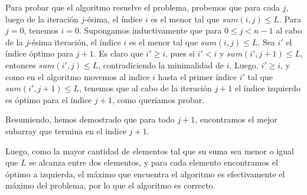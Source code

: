 Para probar que el algoritmo resuelve el problema, probemos que para cada $j$, luego de la iteraci\'on $j$-\'esima, el \'indice $i$ es el menor tal que $sum(i, j) \leq L$. Para $j=0$, tenemos $i=0$. Supongamos inductivamente que para $0\leq j < n-1$ al cabo de la $j$-\'esima iteraci\'on, el \'indice $i$ es el menor tal que $sum(i, j) \leq L$. Sea $i'$ el \'indice \'optimo para $j+1$. Es claro que $i' \geq i$, pues si $i' < i$ y $sum(i', j+1) \leq L$, entonces $sum(i', j) \leq L$, contradiciendo la minimalidad de $i$. Luego, $i' \geq i$, y como en el algoritmo movemos al indice $i$ hasta el primer \'indice $i'$ tal que $sum(i', j+1) \leq L$, tenemos que al cabo de la iteraci\'on $j+1$ el \'indice izquierdo es \'optimo para el \'indice $j+1$, como quer\'iamos probar.

Resumiendo, hemos demostrado que para todo $j+1$, encontramos el mejor subarray que termina en el indice $j+1$.

Luego, como la mayor cantidad de elementos tal que su suma sea menor o igual que $L$ se alcanza entre dos elementos, y para cada elemento encontramos el \'optimo a izquierda, el m\'aximo que encuentra el algoritmo es efectivamente el m\'aximo del problema, por lo que el algoritmo es correcto.